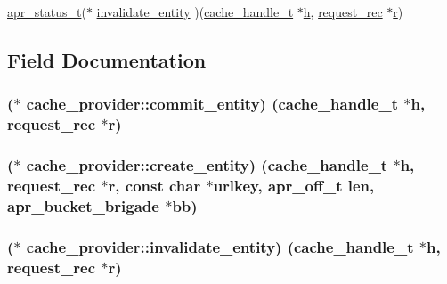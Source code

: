 \begin{DoxyCompactItemize}
\item 
\hyperlink{group__apr__errno_gaa5105fa83cc322f09382292db8b47593}{apr\+\_\+status\+\_\+t}($\ast$ \hyperlink{structcache__provider_a77d0de369d305c7bf1886a95518a7b39}{invalidate\+\_\+entity} )(\hyperlink{group__MOD__CACHE_ga6b7854a2592838a565bdee8f94343aab}{cache\+\_\+handle\+\_\+t} $\ast$\hyperlink{pcregrep_8txt_a373589baca2cb79ec87f46d6599640b9}{h}, \hyperlink{structrequest__rec}{request\+\_\+rec} $\ast$\hyperlink{pcregrep_8txt_a2e9e9438b26c0bb4425367a7e4f75eb3}{r})
\end{DoxyCompactItemize}


\subsection{Field Documentation}
\subsubsection[{\texorpdfstring{commit\+\_\+entity}{commit_entity}}]{($\ast$ cache\+\_\+provider\+::commit\+\_\+entity) ({\bf cache\+\_\+handle\+\_\+t} $\ast${\bf h}, {\bf request\+\_\+rec} $\ast${\bf r})}\hypertarget{structcache__provider_a920b4d4ef856930555054611ac4c374e}{}\label{structcache__provider_a920b4d4ef856930555054611ac4c374e}
\subsubsection[{\texorpdfstring{create\+\_\+entity}{create_entity}}]{($\ast$ cache\+\_\+provider\+::create\+\_\+entity) ({\bf cache\+\_\+handle\+\_\+t} $\ast${\bf h}, {\bf request\+\_\+rec} $\ast${\bf r}, const char $\ast$urlkey, {\bf apr\+\_\+off\+\_\+t} {\bf len}, {\bf apr\+\_\+bucket\+\_\+brigade} $\ast${\bf bb})}\hypertarget{structcache__provider_a274d91e1289fb324e33ee86c8077c3d0}{}\label{structcache__provider_a274d91e1289fb324e33ee86c8077c3d0}
\subsubsection[{\texorpdfstring{invalidate\+\_\+entity}{invalidate_entity}}]{($\ast$ cache\+\_\+provider\+::invalidate\+\_\+entity) ({\bf cache\+\_\+handle\+\_\+t} $\ast${\bf h}, {\bf request\+\_\+rec} $\ast${\bf r})}\hypertarget{structcache__provider_a77d0de369d305c7bf1886a95518a7b39}{}\label{structcache__provider_a77d0de369d305c7bf1886a95518a7b39}
